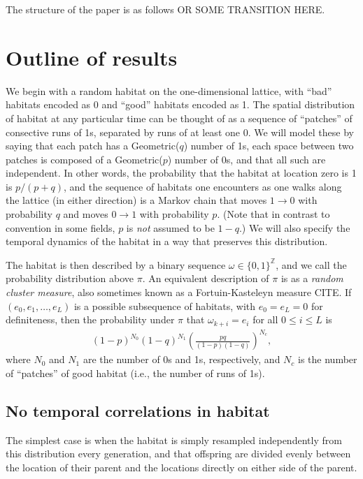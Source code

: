 \documentclass{article}
\newcommand{\Z}{\mathbb{Z}}
\begin{document}
The structure of the paper is as follows OR SOME TRANSITION HERE.


\section{Outline of results}

We begin with a random habitat on the one-dimensional lattice,
with ``bad'' habitats encoded as 0 and ``good'' habitats encoded as 1.
The spatial distribution of habitat at any particular time can be thought of as
a sequence of ``patches'' of consective runs of 1s, separated by runs of at least one 0.
We will model these by saying that each patch has a Geometric($q$) number of 1s,
each space between two patches is composed of a Geometric($p$) number of 0s,
and that all such are independent.
In other words, the probability that the habitat at location zero is 1 is $p/(p+q)$,
and the sequence of habitats one encounters as one walks along the lattice (in either direction)
is a Markov chain that moves $1 \to 0$ with probability $q$ and moves $0 \to 1$ with probability $p$.
(Note that in contrast to convention in some fields, $p$ is \emph{not} assumed to be $1-q$.)
We will also specify the temporal dynamics of the habitat in a way that preserves this distribution.

The habitat is then described by a binary sequence $\omega \in \{0,1\}^\Z$,
and we call the probability distribution above $\pi$.
An equivalent description of $\pi$ is as a \emph{random cluster measure}, 
also sometimes known as a Fortuin-Kasteleyn measure CITE.
If $(e_0, e_1, \ldots, e_L)$ is a possible subsequence of habitats,
with $e_0 = e_L = 0$ for definiteness,
then the probability under $\pi$ that $\omega_{k+i} = e_i$ for all $0 \le i \le L$
is
\begin{align}
    (1-p)^{N_0} (1-q)^{N_1} \left(\frac{pq}{(1-p)(1-q)}\right)^{N_c},
\end{align}
where $N_0$ and $N_1$ are the number of 0s and 1s, respectively,
and $N_c$ is the number of ``patches'' of good habitat (i.e., the number of runs of 1s).

\subsection{No temporal correlations in habitat}
The simplest case is when the habitat is simply resampled independently from this distribution
every generation,
and that offspring are divided evenly between the location of their parent and the locations
directly on either side of the parent.
\end{document}
